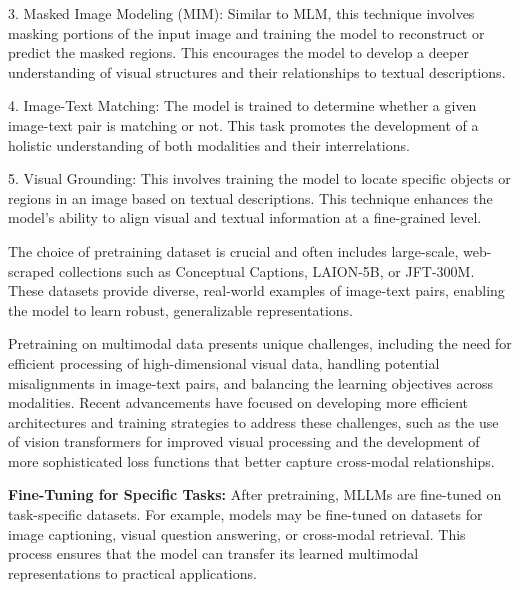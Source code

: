 3. Masked Image Modeling (MIM): Similar to MLM, this technique involves masking portions of the input image and training the model to reconstruct or predict the masked regions. This encourages the model to develop a deeper understanding of visual structures and their relationships to textual descriptions.

4. Image-Text Matching: The model is trained to determine whether a given image-text pair is matching or not. This task promotes the development of a holistic understanding of both modalities and their interrelations.

5. Visual Grounding: This involves training the model to locate specific objects or regions in an image based on textual descriptions. This technique enhances the model's ability to align visual and textual information at a fine-grained level.

The choice of pretraining dataset is crucial and often includes large-scale, web-scraped collections such as Conceptual Captions, LAION-5B, or JFT-300M. These datasets provide diverse, real-world examples of image-text pairs, enabling the model to learn robust, generalizable representations.

Pretraining on multimodal data presents unique challenges, including the need for efficient processing of high-dimensional visual data, handling potential misalignments in image-text pairs, and balancing the learning objectives across modalities. Recent advancements have focused on developing more efficient architectures and training strategies to address these challenges, such as the use of vision transformers for improved visual processing and the development of more sophisticated loss functions that better capture cross-modal relationships.


\textbf{Fine-Tuning for Specific Tasks:} After pretraining, MLLMs are fine-tuned on task-specific datasets. For example, models may be fine-tuned on datasets for image captioning, visual question answering, or cross-modal retrieval. This process ensures that the model can transfer its learned multimodal representations to practical applications.

